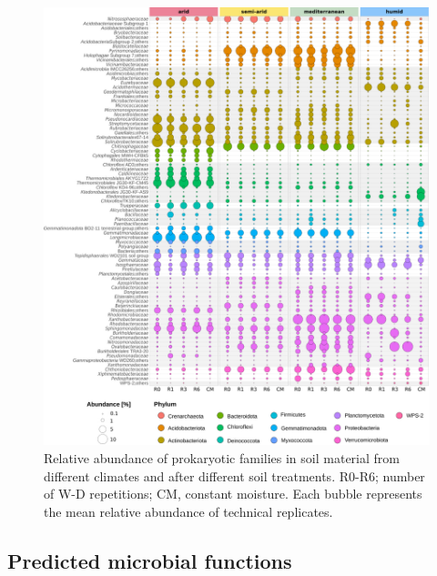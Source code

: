 \begin{figure}[H]
	\centering
	\includegraphics[width=1\textwidth]{img/M4-Figure_6.png}
	\caption{Relative abundance of prokaryotic families in soil material from different climates and after different soil treatments. R0-R6; number of W-D repetitions; CM, constant moisture. Each bubble represents the mean relative abundance of technical replicates.}
	\label{fig:M4-F6}
\end{figure}

\subsection{Predicted microbial functions}

